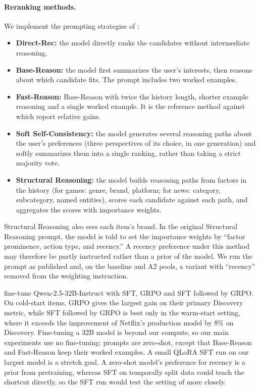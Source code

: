 \documentclass[11pt]{article}
\begin{document}
\paragraph{Reranking methods.} We implement the prompting strategies of \citet{li2026llmreasoning}:
\begin{itemize}
  \item \textbf{Direct-Rec:} the model directly ranks the candidates without intermediate reasoning.
  \item \textbf{Base-Reason:} the model first summarizes the user's interests, then reasons about which candidate fits. The prompt includes two worked examples.
  \item \textbf{Fast-Reason:} Base-Reason with twice the history length, shorter example reasoning and a single worked example. It is the reference method against which \citet{li2026llmreasoning} report relative gains.
  \item \textbf{Soft Self-Consistency:} the model generates several reasoning paths about the user's preferences (three perspectives of its choice, in one generation) and softly summarizes them into a single ranking, rather than taking a strict majority vote.
  \item \textbf{Structural Reasoning:} the model builds reasoning paths from factors in the history (for games: genre, brand, platform; for news: category, subcategory, named entities), scores each candidate against each path, and aggregates the scores with importance weights.
\end{itemize}
Structural Reasoning also sees each item's brand. In the original Structural Reasoning prompt, the model is told to set the importance weights by ``factor prominence, action type, and recency.'' A recency preference under this method may therefore be partly instructed rather than a prior of the model. We run the prompt as published and, on the baseline and A2 pools, a variant with ``recency'' removed from the weighting instruction.

\citet{li2026llmreasoning} fine-tune Qwen-2.5-32B-Instruct with SFT, GRPO and SFT followed by GRPO. On cold-start items, GRPO gives the largest gain on their primary Discovery metric, while SFT followed by GRPO is best only in the warm-start setting, where it exceeds the improvement of Netflix's production model by 8\% on Discovery. Fine-tuning a 32B model is beyond our compute, so our main experiments use no fine-tuning: prompts are zero-shot, except that Base-Reason and Fast-Reason keep their worked examples. A small QLoRA SFT run on our largest model is a stretch goal. A zero-shot model's preference for recency is a prior from pretraining, whereas SFT on temporally split data could teach the shortcut directly, so the SFT run would test the setting of \citet{li2026llmreasoning} more closely.
\end{document}
